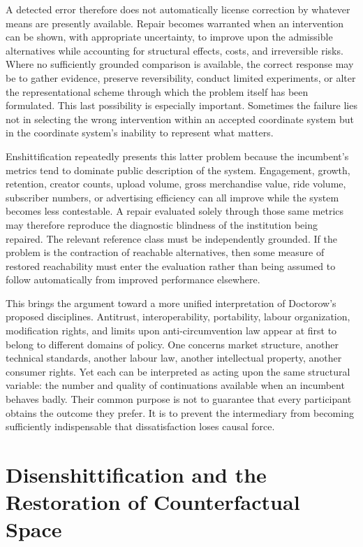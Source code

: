 \documentclass[11pt]{article}
\begin{document}
A detected error therefore does not automatically license correction by whatever means are presently available. Repair becomes warranted when an intervention can be shown, with appropriate uncertainty, to improve upon the admissible alternatives while accounting for structural effects, costs, and irreversible risks. Where no sufficiently grounded comparison is available, the correct response may be to gather evidence, preserve reversibility, conduct limited experiments, or alter the representational scheme through which the problem itself has been formulated. This last possibility is especially important. Sometimes the failure lies not in selecting the wrong intervention within an accepted coordinate system but in the coordinate system's inability to represent what matters.

Enshittification repeatedly presents this latter problem because the incumbent's metrics tend to dominate public description of the system. Engagement, growth, retention, creator counts, upload volume, gross merchandise value, ride volume, subscriber numbers, or advertising efficiency can all improve while the system becomes less contestable. A repair evaluated solely through those same metrics may therefore reproduce the diagnostic blindness of the institution being repaired. The relevant reference class must be independently grounded. If the problem is the contraction of reachable alternatives, then some measure of restored reachability must enter the evaluation rather than being assumed to follow automatically from improved performance elsewhere.

This brings the argument toward a more unified interpretation of Doctorow's proposed disciplines. Antitrust, interoperability, portability, labour organization, modification rights, and limits upon anti-circumvention law appear at first to belong to different domains of policy. One concerns market structure, another technical standards, another labour law, another intellectual property, another consumer rights. Yet each can be interpreted as acting upon the same structural variable: the number and quality of continuations available when an incumbent behaves badly. Their common purpose is not to guarantee that every participant obtains the outcome they prefer. It is to prevent the intermediary from becoming sufficiently indispensable that dissatisfaction loses causal force.

\section{Disenshittification and the Restoration of Counterfactual Space}
\end{document}
